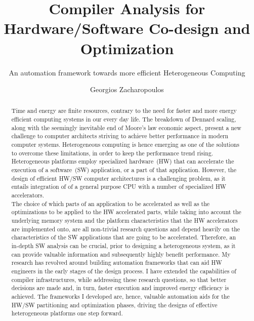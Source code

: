 \documentclass[]{usiinfthesis}
\title{Compiler Analysis for Hardware/Software Co-design and Optimization}
\subtitle{An automation framework towards more efficient Heterogeneous Computing} %
\author{Georgios Zacharopoulos} %
\newcommand{\HW}{{hardware}}
\newcommand{\SW}{{software}}
\begin{document}
\maketitle %

\frontmatter %

\begin{abstract}
Time and energy are finite resources, contrary to the need for faster and more energy efficient computing 
systems in our every day life.
The breakdown of Dennard scaling, along with the seemingly inevitable end of 
Moore's law economic aspect, present a new challenge to computer architects striving to achieve
better performance in modern computer systems. Heterogeneous computing is hence 
emerging as one of the solutions to overcome these limitations, in order to keep the performance 
trend rising. 
Heterogeneous platforms employ 
specialized \HW\ (HW) that 
can accelerate the execution of a \SW\ (SW) application, or a part of that application.
However, the design of efficient HW/SW computer architectures is a challenging problem, as it entails 
integration of of a general purpose CPU with a number of specialized HW accelerators.\\
The choice of which parts of an application to be accelerated as well as the 
optimizations to be applied to the HW accelerated parts, while taking into account the underlying 
memory system and the platform characteristics that the HW accelerators are implemented onto, are 
all non-trivial research questions and depend heavily on the characteristics of the SW applications that
are going to be accelerated. 
Therefore, an in-depth SW analysis can be crucial, prior to 
designing a heterogeneous system, as it can provide valuable information and subsequently 
highly benefit performance. 
My research has revolved around building automation frameworks that can aid HW engineers in the
early stages of the design process. I have extended the capabilities of compiler infrastructures,
while addressing these research questions, 
so that
better decisions are made and, in turn, faster execution and improved energy efficiency is achieved.
The frameworks I developed are, hence, valuable automation aids for the HW/SW partitioning and optimization 
phases, driving the designs of effective heterogeneous platforms one step forward.
\end{abstract}
\end{document}
